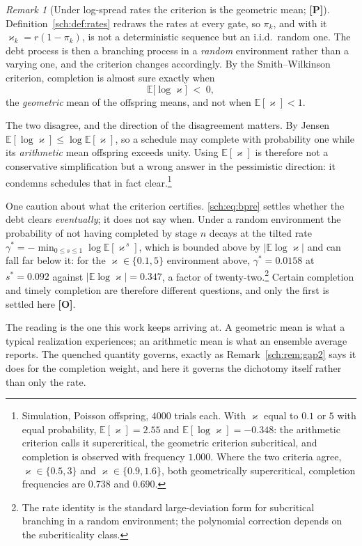 \documentclass[11pt]{article}
\numberwithin{equation}{section}
\theoremstyle{plain}
\theoremstyle{definition}
\theoremstyle{remark}
\newtheorem{remark}[theorem]{Remark}
\newcommand{\E}{\mathbb{E}}
\begin{document}
\begin{remark}[Under log-spread rates the criterion is the geometric
mean; \textbf{[P]}]\label{sch:rem:bpre}
Definition~\ref{sch:def:rates} redraws the rates at every gate, so
$\pi_k$, and with it $\varkappa_k=r(1-\pi_k)$, is not a deterministic
sequence but an i.i.d.\ random one. The debt process is then a branching
process in a \emph{random} environment rather than a varying one, and the
criterion changes accordingly. By the Smith--Wilkinson criterion,
completion is almost sure exactly when
\begin{equation}\label{sch:eq:bpre}
\E\bigl[\log \varkappa\bigr]\;<\;0,
\end{equation}
the \emph{geometric} mean of the offspring means, and not when
$\E[\varkappa]<1$.

The two disagree, and the direction of the disagreement matters. By
Jensen $\E[\log \varkappa]\le\log\E[\varkappa]$, so a schedule may complete with
probability one while its \emph{arithmetic} mean offspring exceeds
unity. Using $\E[\varkappa]$ is therefore not a conservative simplification but
a wrong answer in the pessimistic direction: it condemns schedules that
in fact clear.\footnote{Simulation, Poisson offspring, $4000$ trials
each. With $\varkappa$ equal to $0.1$ or $5$ with equal probability,
$\E[\varkappa]=2.55$ and $\E[\log \varkappa]=-0.348$: the arithmetic criterion calls it
supercritical, the geometric criterion subcritical, and completion is
observed with frequency $1.000$. Where the two criteria agree, $\varkappa\in\{0.5,3\}$ and $\varkappa\in\{0.9,1.6\}$, both geometrically supercritical, completion frequencies are $0.738$ and $0.690$.}

One caution about what the criterion certifies. \eqref{sch:eq:bpre}
settles whether the debt clears \emph{eventually}; it does not say when.
Under a random environment the probability of not having completed by
stage $n$ decays at the tilted rate
$\gamma^\ast=-\min_{0\le s\le1}\log\E[\varkappa^{\,s}]$, which is bounded
above by $|\E\log\varkappa|$ and can fall far below it: for the
$\varkappa\in\{0.1,5\}$ environment above, $\gamma^\ast=0.0158$ at
$s^\ast=0.092$ against $|\E\log\varkappa|=0.347$, a factor of
twenty-two.\footnote{The rate identity is the standard large-deviation
form for subcritical branching in a random environment; the polynomial
correction depends on the subcriticality class.} Certain completion and
timely completion are therefore different questions, and only the first
is settled here \textbf{[O]}.

The reading is the one this work keeps arriving at. A geometric mean is
what a typical realization experiences; an arithmetic mean is what an
ensemble average reports. The quenched quantity governs, exactly as
Remark~\ref{sch:rem:gap2} says it does for the completion weight, and
here it governs the dichotomy itself rather than only the rate.
\end{remark}
\end{document}
